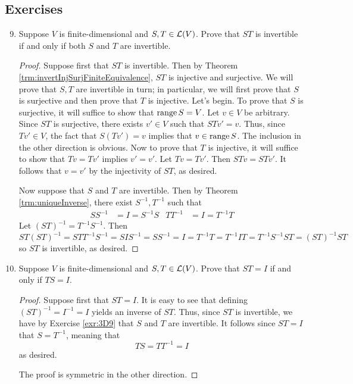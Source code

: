 \documentclass[../main.tex]{subfiles}
\begin{document}
\subsection*{Exercises}
\begin{enumerate}[label={\textbf{\arabic*}},labelsep=1em,ref={\thesection.\arabic*}]
    \setcounter{enumi}{8}
    \item {}\label{exr:3D9}Suppose $V$ is finite-dimensional and $S,T\in\mathcal{L}(V)$. Prove that $ST$ is invertible if and only if both $S$ and $T$ are invertible.
    \begin{proof}
        Suppose first that $ST$ is invertible. Then by Theorem \ref{trm:invertInjSurjFiniteEquivalence}, $ST$ is injective and surjective. We will prove that $S,T$ are invertible in turn; in particular, we will first prove that $S$ is surjective and then prove that $T$ is injective. Let's begin. To prove that $S$ is surjective, it will suffice to show that $\operatorname{range} S=V$. Let $v\in V$ be arbitrary. Since $ST$ is surjective, there exists $v'\in V$ such that $STv'=v$. Thus, since $Tv'\in V$, the fact that $S(Tv')=v$ implies that $v\in\operatorname{range} S$. The inclusion in the other direction is obvious. Now to prove that $T$ is injective, it will suffice to show that $Tv=Tv'$ implies $v'=v'$. Let $Tv=Tv'$. Then $STv=STv'$. It follows that $v=v'$ by the injectivity of $ST$, as desired.\par
        Now suppose that $S$ and $T$ are invertible. Then by Theorem \ref{trm:uniqueInverse}, there exist $S^{-1},T^{-1}$ such that
        \begin{align*}
            SS^{-1} &= I = S^{-1}S&
            TT^{-1} &= I = T^{-1}T
        \end{align*}
        Let $(ST)^{-1}=T^{-1}S^{-1}$. Then
        \begin{equation*}
            ST(ST)^{-1} = STT^{-1}S^{-1} = SIS^{-1} = SS^{-1} = I = T^{-1}T = T^{-1}IT = T^{-1}S^{-1}ST = (ST)^{-1}ST
        \end{equation*}
        so $ST$ is invertible, as desired.
    \end{proof}
    \item \label{exr:3D10}Suppose $V$ is finite-dimensional and $S,T\in\mathcal{L}(V)$. Prove that $ST=I$ if and only if $TS=I$.
    \begin{proof}
        Suppose first that $ST=I$. It is easy to see that defining $(ST)^{-1}=I^{-1}=I$ yields an inverse of $ST$. Thus, since $ST$ is invertible, we have by Exercise \ref{exr:3D9} that $S$ and $T$ are invertible. It follows since $ST=I$ that $S=T^{-1}$, meaning that
        \begin{equation*}
            TS = TT^{-1} = I
        \end{equation*}
        as desired.\par
        The proof is symmetric in the other direction.
    \end{proof}
\end{enumerate}
\end{document}
